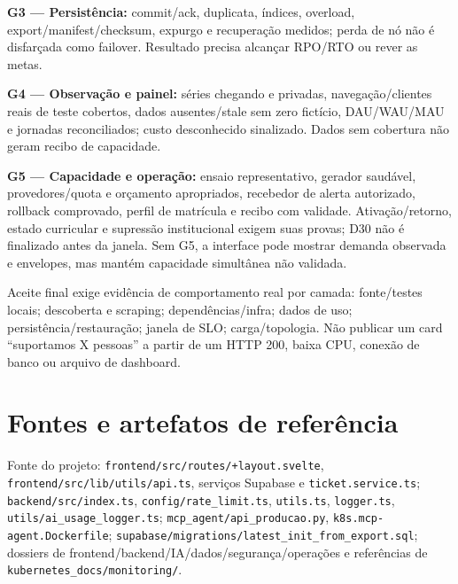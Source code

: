 \documentclass[10pt,a4paper]{article}
\begin{document}
\textbf{G3 --- Persistência:} commit/ack, duplicata, índices, overload,
export/manifest/checksum, expurgo e recuperação medidos; perda de nó não
é disfarçada como failover. Resultado precisa alcançar RPO/RTO ou rever
as metas.

\textbf{G4 --- Observação e painel:} séries chegando e privadas,
navegação/clientes reais de teste cobertos, dados ausentes/stale sem
zero fictício, DAU/WAU/MAU e jornadas reconciliados; custo desconhecido
sinalizado. Dados sem cobertura não geram recibo de capacidade.

\textbf{G5 --- Capacidade e operação:} ensaio representativo, gerador
saudável, provedores/quota e orçamento apropriados, recebedor de alerta
autorizado, rollback comprovado, perfil de matrícula e recibo com
validade. Ativação/retorno, estado curricular e supressão institucional
exigem suas provas; D30 não é finalizado antes da janela. Sem G5, a
interface pode mostrar demanda observada e envelopes, mas mantém
capacidade simultânea não validada.

Aceite final exige evidência de comportamento real por camada:
fonte/testes locais; descoberta e scraping; dependências/infra; dados de
uso; persistência/restauração; janela de SLO; carga/topologia. Não
publicar um card ``suportamos X pessoas'' a partir de um HTTP 200, baixa
CPU, conexão de banco ou arquivo de dashboard.

\clearpage
\section{Fontes e artefatos de
referência}\label{fontes-e-artefatos-de-referuxeancia}

Fonte do projeto: {\footnotesize\ttfamily\nolinkurl{frontend/src/routes/+layout.svelte}},
{\footnotesize\ttfamily\nolinkurl{frontend/src/lib/utils/api.ts}}, serviços Supabase e
{\footnotesize\ttfamily\nolinkurl{ticket.service.ts}}; {\footnotesize\ttfamily\nolinkurl{backend/src/index.ts}},
{\footnotesize\ttfamily\nolinkurl{config/rate_limit.ts}}, {\footnotesize\ttfamily\nolinkurl{utils.ts}}, {\footnotesize\ttfamily\nolinkurl{logger.ts}},
{\footnotesize\ttfamily\nolinkurl{utils/ai_usage_logger.ts}};
{\footnotesize\ttfamily\nolinkurl{mcp_agent/api_producao.py}}, {\footnotesize\ttfamily\nolinkurl{k8s.mcp-agent.Dockerfile}};
{\footnotesize\ttfamily\nolinkurl{supabase/migrations/latest_init_from_export.sql}}; dossiers de
frontend/backend/IA/dados/segurança/operações e referências de
{\footnotesize\ttfamily\nolinkurl{kubernetes_docs/monitoring/}}.
\end{document}
